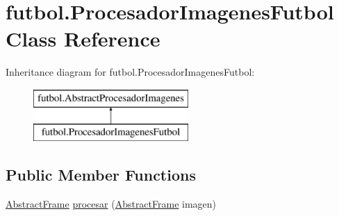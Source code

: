 \hypertarget{classfutbol_1_1_procesador_imagenes_futbol}{}\section{futbol.\+Procesador\+Imagenes\+Futbol Class Reference}
\label{classfutbol_1_1_procesador_imagenes_futbol}
Inheritance diagram for futbol.\+Procesador\+Imagenes\+Futbol\+:\begin{figure}[H]
\begin{center}
\leavevmode
\includegraphics[height=2.000000cm]{classfutbol_1_1_procesador_imagenes_futbol}
\end{center}
\end{figure}
\subsection*{Public Member Functions}
\begin{DoxyCompactItemize}
\item 
\hyperlink{classfutbol_1_1_abstract_frame}{Abstract\+Frame} \hyperlink{classfutbol_1_1_procesador_imagenes_futbol_a40be13ca858cf1ffacc446f2c271816e}{procesar} (\hyperlink{classfutbol_1_1_abstract_frame}{Abstract\+Frame} imagen)
\end{DoxyCompactItemize}
